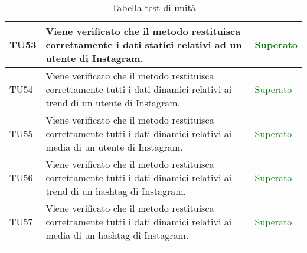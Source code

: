 \begin{center}
\begin{longtable}{| p{2cm} | p{8cm} | p{2.5cm} |}
					\hline
					TU53 & Viene verificato che il metodo restituisca correttamente i dati statici relativi ad un utente di Instagram. & \textcolor{green}{Superato}\\
					\hline
					TU54 & Viene verificato che il metodo restituisca correttamente tutti i dati dinamici relativi ai trend di un utente di Instagram. & \textcolor{green}{Superato}\\
					\hline
					TU55 & Viene verificato che il metodo restituisca correttamente tutti i dati dinamici relativi ai media di un utente di Instagram. & \textcolor{green}{Superato}\\
					\hline
					TU56 & Viene verificato che il metodo restituisca correttamente tutti i dati dinamici relativi ai trend di un hashtag di Instagram. & \textcolor{green}{Superato}\\
					\hline
					TU57 & Viene verificato che il metodo restituisca correttamente tutti i dati dinamici relativi ai media di un hashtag di Instagram. & \textcolor{green}{Superato}\\
					\hline			
					\caption{Tabella test di unità}
			\end{longtable}
			\egroup
			\end{center}
			
